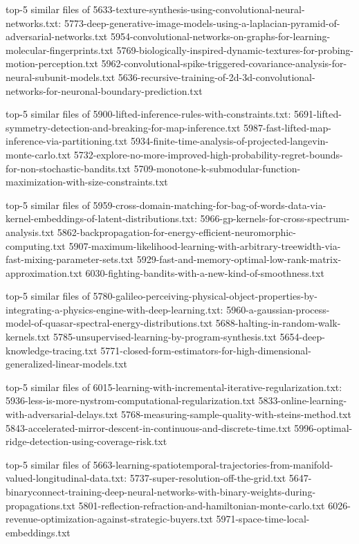 \documentclass[11pt]{article}
\begin{document}
top-5 similar files of
5633-texture-synthesis-using-convolutional-neural-networks.txt:
5773-deep-generative-image-models-using-a-laplacian-pyramid-of-adversarial-networks.txt
5954-convolutional-networks-on-graphs-for-learning-molecular-fingerprints.txt
5769-biologically-inspired-dynamic-textures-for-probing-motion-perception.txt
5962-convolutional-spike-triggered-covariance-analysis-for-neural-subunit-models.txt
5636-recursive-training-of-2d-3d-convolutional-networks-for-neuronal-boundary-prediction.txt

top-5 similar files of 5900-lifted-inference-rules-with-constraints.txt:
5691-lifted-symmetry-detection-and-breaking-for-map-inference.txt
5987-fast-lifted-map-inference-via-partitioning.txt
5934-finite-time-analysis-of-projected-langevin-monte-carlo.txt
5732-explore-no-more-improved-high-probability-regret-bounds-for-non-stochastic-bandits.txt
5709-monotone-k-submodular-function-maximization-with-size-constraints.txt

top-5 similar files of
5959-cross-domain-matching-for-bag-of-words-data-via-kernel-embeddings-of-latent-distributions.txt:
5966-gp-kernels-for-cross-spectrum-analysis.txt
5862-backpropagation-for-energy-efficient-neuromorphic-computing.txt
5907-maximum-likelihood-learning-with-arbitrary-treewidth-via-fast-mixing-parameter-sets.txt
5929-fast-and-memory-optimal-low-rank-matrix-approximation.txt
6030-fighting-bandits-with-a-new-kind-of-smoothness.txt

top-5 similar files of
5780-galileo-perceiving-physical-object-properties-by-integrating-a-physics-engine-with-deep-learning.txt:
5960-a-gaussian-process-model-of-quasar-spectral-energy-distributions.txt
5688-halting-in-random-walk-kernels.txt
5785-unsupervised-learning-by-program-synthesis.txt
5654-deep-knowledge-tracing.txt
5771-closed-form-estimators-for-high-dimensional-generalized-linear-models.txt

top-5 similar files of
6015-learning-with-incremental-iterative-regularization.txt:
5936-less-is-more-nystrom-computational-regularization.txt
5833-online-learning-with-adversarial-delays.txt
5768-measuring-sample-quality-with-steins-method.txt
5843-accelerated-mirror-descent-in-continuous-and-discrete-time.txt
5996-optimal-ridge-detection-using-coverage-risk.txt

top-5 similar files of
5663-learning-spatiotemporal-trajectories-from-manifold-valued-longitudinal-data.txt:
5737-super-resolution-off-the-grid.txt
5647-binaryconnect-training-deep-neural-networks-with-binary-weights-during-propagations.txt
5801-reflection-refraction-and-hamiltonian-monte-carlo.txt
6026-revenue-optimization-against-strategic-buyers.txt
5971-space-time-local-embeddings.txt
\end{document}

